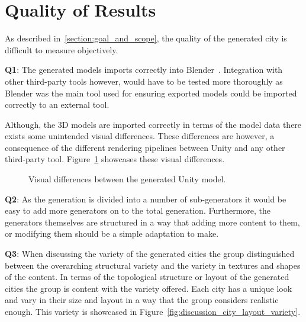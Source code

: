 \section{Quality of Results}

As described in~\ref{section:goal_and_scope}, the quality of the generated city is difficult to measure objectively.

\textbf{Q1}: \newline
The generated models imports correctly into Blender~\cite{blender}.
Integration with other third-party tools however, would have to be tested more thoroughly as Blender was the main tool used for ensuring exported models could be imported correctly to an external tool. 

Although, the 3D models are imported correctly in terms of the model data there exists some unintended visual differences.
These differences are however, a consequence of the different rendering pipelines between Unity and any other third-party tool.
Figure~\ref{fig:blender_shading_result} showcases these visual differences.

\begin{figure}[h!]
  \centering
  \caption{Visual differences between the generated Unity model.}
  \label{fig:blender_shading_result}
\end{figure}


\textbf{Q2}: \newline
As the generation is divided into a number of sub-generators it would be easy to add more generators on to the total generation.
Furthermore, the generators themselves are structured in a way that adding more content to them, or modifying them should be a simple adaptation to make. 

\textbf{Q3}: \newline
When discussing the variety of the generated cities the group distinguished between the overarching structural variety and the variety in textures and shapes of the content.
In terms of the topological structure or layout of the generated cities the group is content with the variety offered.
Each city has a unique look and vary in their size and layout in a way that the group considers realistic enough.
This variety is showcased in Figure~\ref{fig:discussion_city_layout_variety}.

